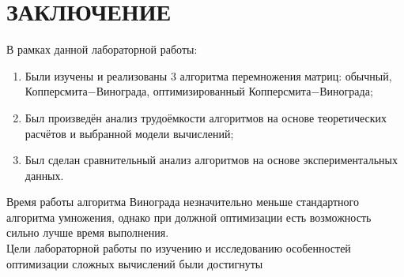 \chapter*{ЗАКЛЮЧЕНИЕ}

В рамках данной лабораторной работы:

\begin{enumerate}
    \item Были изучены и реализованы 3 алгоритма перемножения матриц: обычный, Копперсмита$-$Винограда, оптимизированный Копперсмита$-$Винограда;
    \item Был произведён анализ трудоёмкости алгоритмов на основе теоретических расчётов и выбранной модели вычислений;
    \item Был сделан сравнительный анализ алгоритмов на основе экспериментальных данных.
\end{enumerate}

Время работы алгоритма Винограда незначительно меньше стандартного алгоритма умножения, однако при должной оптимизации есть возможность сильно лучше время выполнения.
\\
Цели лабораторной работы по изучению и исследованию особенностей оптимизации сложных вычислений были достигнуты